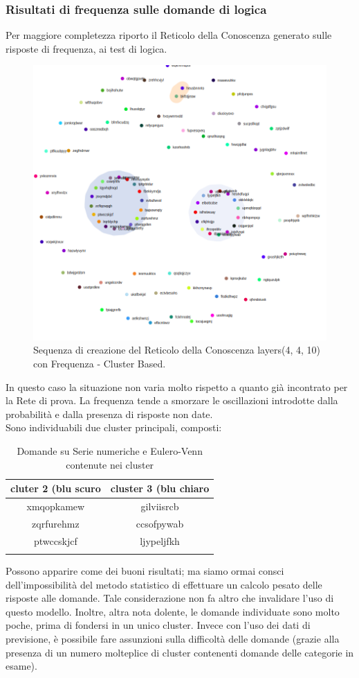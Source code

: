\subsubsection{Risultati di frequenza sulle domande di logica}
\label{Risultati di frequenza sulle domande di logica}
Per maggiore completezza riporto il Reticolo della Conoscenza generato sulle risposte di frequenza, ai test di logica.
\begin{figure}[H]
\centering
	\includegraphics[width=0.70\linewidth]{./image/frequence-logica(4,4,10).png}
	\caption{Sequenza di creazione del Reticolo della Conoscenza layers(4, 4, 10) con Frequenza - Cluster Based.}
	\label{Sequenza di creazione del Reticolo della Conoscenza layers(4, 4, 10) con Frequenza - Cluster Based.}
\end{figure}
\noindent
In questo caso la situazione non varia molto rispetto a quanto già incontrato per la Rete di prova. La frequenza tende a smorzare le oscillazioni introdotte dalla probabilità e dalla presenza di risposte non date.\\
Sono individuabili due cluster principali, composti:
\begin{longtable}{|c|c|}
	\hline
	\textbf{cluter 2 (blu scuro} & \textbf{cluster 3 (blu chiaro} \\\hline\hline
	xmqopkamew & gilviisrcb \\
	zqrfurehmz & ccsofpywab \\
	ptwccskjcf & ljypeljfkh \\
\hline
\caption{Domande su Serie numeriche e Eulero-Venn contenute nei cluster}\label{tab:domande su serie e eulero-venn contenute nei cluste)}
\end{longtable}
\noindent
Possono apparire come dei buoni risultati; ma siamo ormai consci dell'impossibilità del metodo statistico di effettuare un calcolo pesato delle risposte alle domande. Tale considerazione non fa altro che invalidare l'uso di questo modello.
\noindent
Inoltre, altra nota dolente, le domande individuate sono molto poche, prima di fondersi in un unico cluster. Invece con l'uso dei dati di previsione, è possibile fare assunzioni sulla difficoltà delle domande (grazie alla presenza di un numero molteplice di cluster contenenti domande delle categorie in esame).


